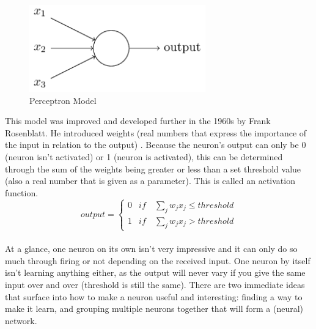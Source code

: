 \documentclass[12pt,a4paper]{article}
\begin{document}
\begin{figure}[ht]
	\includegraphics[width=0.68\textwidth]{perceptron}
	\centering
	\caption{Perceptron Model \protect \cite{nielsenneural}}
	\label{fig:1}
\end{figure}
\par
This model was improved and developed further in the 1960s by Frank Rosenblatt. He introduced weights (real numbers that express the importance of the input in relation to the output) \cite{rosenblatt_perceptron:_1958}. Because the neuron’s output can only be 0 (neuron isn’t activated) or 1 (neuron is activated), this can be determined through the sum of the weights being greater or less than a set threshold value (also a real number that is given as a parameter). This is called an activation function.
\begin{equation}
 output =
    \begin{cases}
      0 & if \quad \sum_{j}^{} w_j x_j \leq threshold\\
      1 & if \quad \sum_{j}^{} w_j x_j > threshold
    \end{cases}
\label{eq:1}
\end{equation}
\\
At a glance, one neuron on its own isn’t very impressive and it can only do so much through firing or not depending on the received input. One neuron by itself isn’t learning anything either, as the output will never vary if you give the same input over and over (threshold is still the same). There are two immediate ideas that surface into how to make a neuron useful and interesting: finding a way to make it learn, and grouping multiple neurons together that will form a (neural) network. \cite{marsland_machine_2015}
\end{document}
